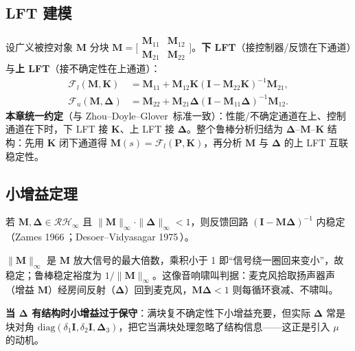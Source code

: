 \subsection{LFT 建模}
设广义被控对象 $\mathbf M$ 分块 $\mathbf M=\big[\begin{smallmatrix}\mathbf M_{11}&\mathbf M_{12}\\\mathbf M_{21}&\mathbf M_{22}\end{smallmatrix}\big]$。\textbf{下 LFT}（接控制器/反馈在下通道）与\textbf{上 LFT}（接不确定性在上通道）：
\begin{align}
  \mathcal F_l(\mathbf M,\mathbf K)&=\mathbf M_{11}+\mathbf M_{12}\mathbf K(\mathbf I-\mathbf M_{22}\mathbf K)^{-1}\mathbf M_{21},\label{eq:lower-lft}\\
  \mathcal F_u(\mathbf M,\boldsymbol\Delta)&=\mathbf M_{22}+\mathbf M_{21}\boldsymbol\Delta(\mathbf I-\mathbf M_{11}\boldsymbol\Delta)^{-1}\mathbf M_{12}.\label{eq:upper-lft}
\end{align}
\textbf{本章统一约定}（与 Zhou--Doyle--Glover\,\cite{zhou1996robust} 标准一致）：性能/不确定通道在上、控制通道在下时，下 LFT 接 $\mathbf K$、上 LFT 接 $\boldsymbol\Delta$。整个鲁棒分析归结为 $\boldsymbol\Delta$--$\mathbf M$--$\mathbf K$ 结构：先用 $\mathbf K$ 闭下通道得 $\mathbf M(s)=\mathcal F_l(\mathbf P,\mathbf K)$，再分析 $\mathbf M$ 与 $\boldsymbol\Delta$ 的上 LFT 互联稳定性。

\subsection{小增益定理}
\begin{theorem}[小增益定理]
\label{thm:small-gain}
若 $\mathbf M,\boldsymbol\Delta\in\mathcal{RH}_\infty$ 且 $\|\mathbf M\|_\infty\cdot\|\boldsymbol\Delta\|_\infty<1$，则反馈回路 $(\mathbf I-\mathbf M\boldsymbol\Delta)^{-1}$ 内稳定（Zames 1966\,\cite{zames1966inputoutput}；Desoer--Vidyasagar 1975\,\cite{desoer1975feedback}）。
\end{theorem}
$\|\mathbf M\|_\infty$ 是 $\mathbf M$ 放大信号的最大倍数，乘积小于 1 即“信号绕一圈回来变小”，故稳定；鲁棒稳定裕度为 $1/\|\mathbf M\|_\infty$。这像音响啸叫判据：麦克风拾取扬声器声（增益 $\mathbf M$）经房间反射（$\boldsymbol\Delta$）回到麦克风，$\mathbf M\boldsymbol\Delta<1$ 则每循环衰减、不啸叫。

\textbf{当 $\boldsymbol\Delta$ 有结构时小增益过于保守}：满块复不确定性下小增益充要，但实际 $\boldsymbol\Delta$ 常是块对角 $\mathrm{diag}(\delta_1\mathbf I,\delta_2\mathbf I,\boldsymbol\Delta_3)$，把它当满块处理忽略了结构信息——这正是引入 $\mu$ 的动机。

